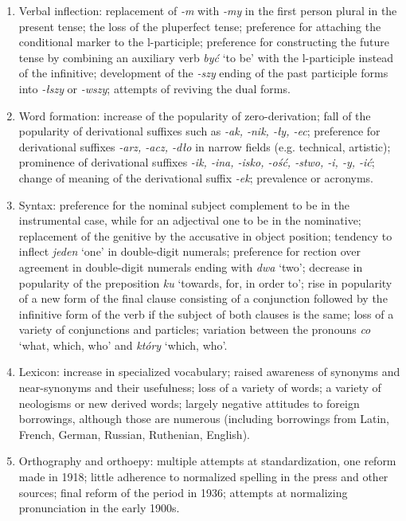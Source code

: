 \begin{enumerate}
    \item Verbal inflection: replacement of \textit{-m} with \textit{-my} in the first person plural in the present tense; the loss of the pluperfect tense; preference for attaching the conditional marker to the l-participle; preference for constructing the future tense by combining an auxiliary verb \textit{być} `to be' with the l-participle instead of the infinitive; development of the \textit{-szy} ending of the past participle forms into \textit{-łszy} or \textit{-wszy}; attempts of reviving the dual forms.
    
    \item Word formation: increase of the popularity of zero-derivation; fall of the popularity of derivational suffixes such as \textit{-ak, -nik, -ły, -ec}; preference for derivational suffixes \textit{-arz, -acz, -dło} in narrow fields (e.g. technical, artistic); prominence of derivational suffixes \textit{-ik, -ina, -isko, -ość, -stwo, -i, -y, -ić}; change of meaning of the derivational suffix \textit{-ek}; prevalence or acronyms.

    \item Syntax: preference for the nominal subject complement to be in the instrumental case, while for an adjectival one to be in the nominative; replacement of the genitive by the accusative in object position; tendency to inflect \textit{jeden} `one' in double-digit numerals; preference for rection over agreement in double-digit numerals ending with \textit{dwa} `two'; decrease in popularity of the preposition \textit{ku} `towards, for, in order to'; rise in popularity of a new form of the final clause consisting of a conjunction followed by the infinitive form of the verb if the subject of both clauses is the same; loss of a variety of conjunctions and particles; variation between the pronouns \textit{co} `what, which, who' and \textit{który} `which, who'. 

    \item Lexicon: increase in specialized vocabulary; raised awareness of synonyms and near-synonyms and their usefulness; loss of a variety of words; a variety of neologisms or new derived words; largely negative attitudes to foreign borrowings, although those are numerous (including borrowings from Latin, French, German, Russian, Ruthenian, English).

    \item Orthography and orthoepy: multiple attempts at standardization, one reform made in 1918; little adherence to normalized spelling in the press and other sources; final reform of the period in 1936; attempts at normalizing pronunciation in the early 1900s.

\end{enumerate}

